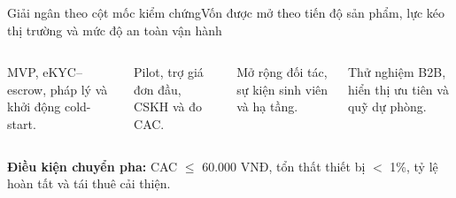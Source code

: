 \begin{frame}{Giải ngân theo cột mốc kiểm chứng}{Vốn được mở theo tiến độ sản phẩm, lực kéo thị trường và mức độ an toàn vận hành}
  \begin{columns}[T,onlytextwidth]
      \par\vspace{.3em}
      MVP, eKYC--escrow, pháp lý và khởi động cold-start.
      \par\vspace{.3em}
      Pilot, trợ giá đơn đầu, CSKH và đo CAC.
      \par\vspace{.3em}
      Mở rộng đối tác, sự kiện sinh viên và hạ tầng.
      \par\vspace{.3em}
      Thử nghiệm B2B, hiển thị ưu tiên và quỹ dự phòng.
  \end{columns}
  \vfill
  \centering\small
  \textcolor{mutuxBlue}{\textbf{Điều kiện chuyển pha:}} CAC $\leq$ 60.000 VNĐ, tổn thất thiết bị $<$ 1\%, tỷ lệ hoàn tất và tái thuê cải thiện.
\end{frame}
